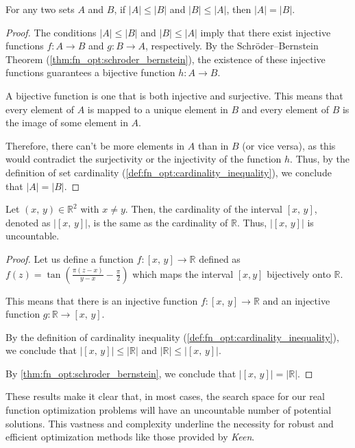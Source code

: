     \begin{corollary}
    \label{cor:fn_opt:cardinality}
        For any two sets \(A\) and \(B\), if \(|A| \leq |B|\) and \(|B| \leq |A|\), then \(|A| = |B|\).
    \end{corollary}

    \begin{proof}
        The conditions \(|A| \leq |B|\) and \(|B| \leq |A|\) imply that there exist injective functions 
        \(f: A \rightarrow B\) and \(g: B \rightarrow A\), respectively. By the Schröder--Bernstein Theorem 
        (\vref{thm:fn_opt:schroder_bernstein}), the existence of these injective functions guarantees a bijective 
        function \(h: A \rightarrow B\).

        A bijective function is one that is both injective and surjective. This means that every element of \(A\) is 
        mapped to a unique element in \(B\) and every element of \(B\) is the image of some element in \(A\).

        Therefore, there can't be more elements in \(A\) than in \(B\) (or vice versa), as this would contradict the 
        surjectivity or the injectivity of the function \(h\). Thus, by the definition of set cardinality 
        (\vref{def:fn_opt:cardinality_inequality}), we conclude that \(|A| = |B|\).
    \end{proof}

    \begin{theorem}
    \label{thm:fn_opt:cardinality}
        Let $(x,\,y) \in \mathbb{R}^2$ with $x \neq y$. Then, the cardinality of the interval $[x,\,y]$, denoted as 
        $|[x,\,y]|$, is the same as the cardinality of \(\mathbb{R}\). Thus, $|[x,\,y]|$ is uncountable.
    \end{theorem}

    \begin{proof}
        Let us define a function \(f: [x,\,y] \rightarrow \mathbb{R}\) defined as \(f(z) = 
        \tan\left(\frac{\pi(z-x)}{y-x} - \frac{\pi}{2}\right)\) which maps the interval \([x, y]\) bijectively onto 
        \(\mathbb{R}\).
        
        This means that there is an injective function \(f: [x,\,y] \rightarrow \mathbb{R}\) and an injective function 
        \(g: \mathbb{R} \rightarrow [x,\,y]\).

        By the definition of cardinality inequality (\vref{def:fn_opt:cardinality_inequality}), we conclude that 
        \(|[x,\,y]| \leq |\mathbb{R}|\) and \(|\mathbb{R}| \leq |[x,\,y]|\).

        By \vref{thm:fn_opt:schroder_bernstein}, we conclude that \(|[x,\,y]| = |\mathbb{R}|\).
    \end{proof}    

    These results make it clear that, in most cases, the search space for our real function optimization problems will 
    have an uncountable number of potential solutions. This vastness and complexity underline the necessity for robust 
    and efficient optimization methods like those provided by \textit{Keen}.